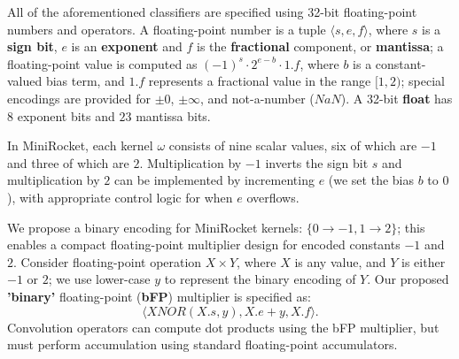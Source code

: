 All of the aforementioned classifiers are specified using 32-bit floating-point numbers and operators. 
A floating-point number is a tuple $\langle s, e, f \rangle$, where $s$ is a \textbf{sign bit}, $e$ is an \textbf{exponent} and $f$ is the \textbf{fractional} component, or \textbf{mantissa}; a floating-point value is computed as $(-1)^s\cdot2^{e-b}\cdot1.f$, where $b$ is a constant-valued bias term, and $1.f$ represents a fractional value in the range $[1, 2)$; special encodings are provided for $\pm 0$, $\pm \infty$, and not-a-number ($NaN$). A 32-bit \textbf{float} has $8$ exponent bits and $23$ mantissa bits. 

In MiniRocket, each kernel $\omega$ consists of nine scalar values, six of which are $-1$ and three of which are $2$. 
Multiplication by $-1$ inverts the sign bit $s$ and multiplication by $2$ can be implemented by incrementing $e$ (we set the bias $b$ to $0$), with appropriate control logic for when $e$ overflows. %

We propose a binary encoding for MiniRocket kernels: $\{0 \rightarrow -1, 1 \rightarrow 2\}$; this enables a compact floating-point multiplier design for encoded constants $-1$ and $2$. 
Consider floating-point operation $X \times Y$, where $X$ is any value, and $Y$ is either $-1$ or $2$; we use lower-case $y$ to represent the binary encoding of $Y$. Our proposed \textbf{'binary'} floating-point (\textbf{bFP}) multiplier is specified as:
\begin{equation}
    \langle XNOR(X.s, y), X.e + y, X.f\rangle.
    \label{eq:bFP}
\end{equation}
Convolution operators can compute dot products using the bFP multiplier, but must perform accumulation using standard floating-point accumulators. 

